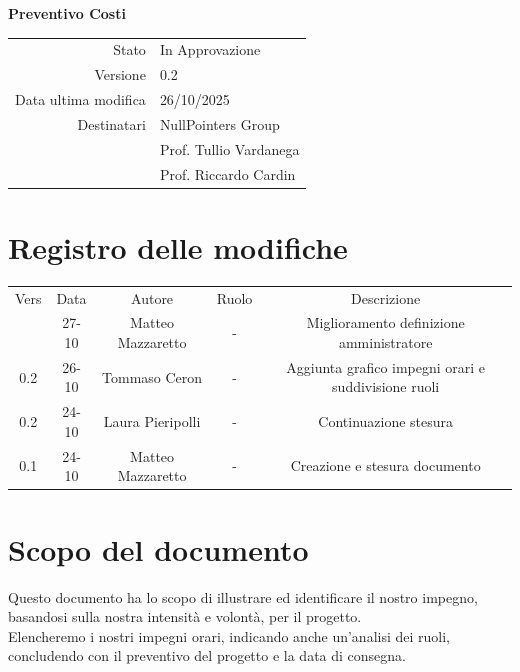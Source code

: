 \documentclass{article}
\begin{document}
	\vspace{2cm}
	
	{
		\centering
		\Huge\bfseries Preventivo Costi\par
		\vspace{0.5cm}
	}
	
	\begin{center}
		\begin{tabular}{r|l}
			Stato & In Approvazione \\
			Versione & 0.2 \\
			Data ultima modifica & 26/10/2025 \\
			Destinatari & NullPointers Group \\
			& Prof. Tullio Vardanega \\
			& Prof. Riccardo Cardin \\
		\end{tabular}
	\end{center}
	
	\newpage
	\section{Registro delle modifiche}
	
	\begin{table}[htbp]
		\begin{tabular}{|c|c|c|c|c|}
			\hline
			\rowcolor[gray]{0.9}
			Vers & Data & Autore & Ruolo & Descrizione \\
			0.3 & 27-10 & Matteo Mazzaretto & - & Miglioramento definizione amministratore  \\ 
			\hline
			0.2 & 26-10 & Tommaso Ceron & - & Aggiunta grafico impegni orari e suddivisione ruoli\\
			\hline
			0.2 & 24-10 & Laura Pieripolli & - & Continuazione stesura \\
			\hline
			0.1 & 24-10 & Matteo Mazzaretto & - & Creazione e stesura documento \\
			\hline
		\end{tabular}
	\end{table}
	
	\newpage
	
	\section{Scopo del documento}
	Questo documento ha lo scopo di illustrare ed identificare il nostro impegno, basandosi sulla nostra intensità e volontà, per il progetto.\\
	Elencheremo i nostri impegni orari, indicando anche un'analisi dei ruoli, concludendo con il preventivo del progetto e la data di consegna.\\
	\begin{center}
		
	\end{center}
	
\end{document}
